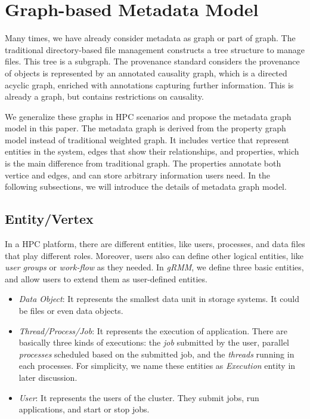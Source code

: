 \section{Graph-based Metadata Model}
Many times, we have already consider metadata as graph or part of graph. The traditional directory-based file management constructs a tree structure to manage files. This tree is a subgraph. The provenance standard considers the provenance of objects is represented by an annotated causality graph, which is a directed acyclic graph, enriched with annotations capturing further information. This is already a graph, but contains restrictions on causality.

We generalize these graphs in HPC scenarios and propose the metadata graph model in this paper. The metadata graph is derived from the property graph model instead of traditional weighted graph. It includes vertice that represent entities in the system, edges that show their relationships, and properties, which is the main difference from traditional graph. The properties annotate both vertice and edges, and can store arbitrary information users need. In the following subsections, we will introduce the details of metadata graph model.

\subsection{Entity/Vertex}

In a HPC platform, there are different entities, like users, processes, and data files that play different roles. Moreover, users also can define other logical entities, like \textit{user groups} or \textit{work-flow} as they needed. 
In \textit{gRMM}, we define
three basic entities, and allow users to extend them as user-defined entities.

\begin{itemize}
\item \textit{Data Object}: It represents the smallest data unit in storage systems. It could be files or even data objects. 

\item \textit{Thread/Process/Job}: It represents the execution of application. There are
basically three kinds of executions: the \textit{job} submitted by
the user, parallel \textit{processes} scheduled based on the submitted job, and the \textit{threads} running in each processes. For simplicity, we name these entities as \textit{Execution} entity in later discussion.

\item \textit{User}: It represents the users of the cluster. They submit jobs, run applications, and start or stop jobs.
\end{itemize}

